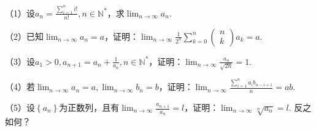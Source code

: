 \enlargethispage{\baselineskip}
\begin{example}
    （1）设\(a_{n} = \frac{\sum _{i = 1}^{n} i !}{n !} , n \in \mathbb{N}^{*}\)，求\(\lim_{n
        \to \infty} a_{n}\).

    （2）已知\(\lim_{n \to \infty} a_{n} = a\)，证明：\(\lim_{n \to
        \infty} \frac{1}{2^{n}} \sum _{k = 0}^{n} \left( \begin{matrix}n \\ k\end{matrix} \right) a_{k} = a\).

    （3）设\(a_{1} > 0 , a_{n + 1} = a_{n} + \frac{1}{a_{n}} , n \in
    \mathbb{N}^{*}\)，证明：\(\lim_{n \to \infty} \frac{a_{n}}{\sqrt{2 n}} = 1\).

    （4）若\(\lim_{n \to \infty} a_{n} = a , \lim_{n \to \infty}
    b_{n} = b\)，证明：\(\lim_{n \to \infty} \frac{\sum _{i = 1}^{n} a_{i}
        b_{n - i + 1}}{n} = a b\).

    （5）设\(\left\{ a_{n} \right\}\)为正数列，且有\(\lim_{n \to \infty} \frac{a_{n
                + 1}}{a_{n}} = l\)，证明：\(\lim_{n \to \infty} \sqrt[n]{a_{n}} = l\).
    反之如何？
\end{example}
